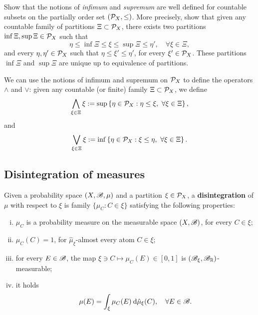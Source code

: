 \begin{exercise}\label{exer:inf-sup-well-defined-on-partitions}
  Show that the notions of \emph{infimum} and \emph{supremum} are well defined for countable subsets on the partially order set $(\mathcal{P}_{X},\leq)$. More precisely, show that given any countable family of partitions $\Xi\subset\mathcal{P}_{X}$, there exists two partitions $\inf\Xi,\sup\Xi\in\mathcal{P}_{X}$ such that
  \begin{displaymath}
    \eta\leq\inf\Xi\leq \xi\leq \sup\Xi\leq\eta', \quad\forall \xi\in\Xi,
  \end{displaymath}
  and every $\eta,\eta'\in\mathcal{P}_{X}$ such that $\eta\leq \xi'\leq \eta'$, for every $\xi'\in\mathcal{P}_{X}$. These partitions $\inf\Xi$ and $\sup\Xi$ are unique up to equivalence of partitions.
\end{exercise}

We can use the notions of infimum and supremum on $\mathcal{P}_{X}$ to define the operators $\wedge$ and $\vee$: given any countable (or finite) family $\Xi\subset\mathcal{P}_{X}$, we define
\begin{displaymath}
  \bigwedge_{\xi\in\Xi} \xi :=\sup\left\{\eta\in\mathcal{P}_{X} : \eta\leq\xi,\ \forall \xi\in\Xi\right\},
\end{displaymath}
and
\begin{equation}\label{eq:partitions-upper-limit-def}
  \bigvee_{\xi\in\Xi} \xi :=\inf\left\{\eta\in\mc{P}_{X} : \xi\leq\eta,\ \forall\xi\in\Xi\right\}.
\end{equation}



\subsection{Disintegration of measures}\label{sec:disintegrations-measures}

Given a probability space $(X,\mathscr{B},\mu)$ and a partition $\xi\in\mathcal{P}_{X}$, a \textbf{disintegration} of $\mu$ with respect to $\xi$ is family $\{\mu_{C} : C\in\xi\}$ satisfying the following properties:
\begin{enumerate}[(i)]
  \item $\mu_{C}$ is a probability measure on the measurable space $(X,\mathscr{B})$, for every $C\in\xi$;
  \item $\mu_{C}(C)=1$, for $\hat\mu_{\xi}$-almost every atom $C\in\xi$;
  \item for every $E\in\mathscr{B}$, the map $\xi\ni C\mapsto \mu_{C}(E)\in[0,1]$ is $(\mathscr{B}_{\xi},\mathscr{B}_{\mathbb{R}})$-measurable;
  \item it holds
        \begin{displaymath}
          \mu(E)=\int_{\xi} \mu_{C}(E)\:\mathrm{d}\hat\mu_{\xi}(C), \quad\forall E\in\mathscr{B}.
        \end{displaymath}
\end{enumerate}

